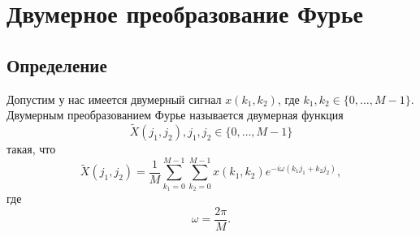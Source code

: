 \section{Двумерное преобразование Фурье}
\subsection{Определение}

\begin{definition}
Допустим у нас имеется двумерный сигнал $x\left(k_1, k_2\right)$, где 
$k_1,k_2 \in \{0, \dots, M - 1\}$. Двумерным преобразованием Фурье
называется двумерная функция 
\[
\tilde{X}\left(j_1, j_2\right), j_1,j_2
\in \{0, \dots, M - 1\}
\]
такая, что
\[
\tilde{X}\left(j_1, j_2\right) = 
\frac{1}{M}\sum_{k_1 = 0}^{M-1}\sum_{k_2 = 0}^{M-1}
x\left(k_1, k_2\right)e^{-i \omega\left(k_1 j_1 + k_2 j_2\right)},
\]
где
\[
\omega = \frac{2 \pi}{M}.
\]
\label{def:add:dsp:fourier2d}
\end{definition}

